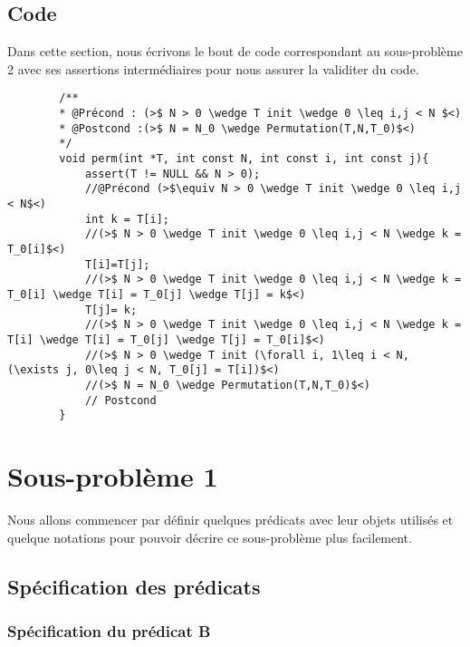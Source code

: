 \documentclass[a4paper, 11pt, oneside]{article}
\begin{document}
    \subsection{Code}
        Dans cette section, nous écrivons le bout de code correspondant au sous-problème 2 avec ses assertions
        intermédiaires pour nous assurer la validiter du code.
        \begin{lstlisting}
        /**
        * @Précond : (>$ N > 0 \wedge T init \wedge 0 \leq i,j < N $<)
        * @Postcond :(>$ N = N_0 \wedge Permutation(T,N,T_0)$<)
        */
        void perm(int *T, int const N, int const i, int const j){
            assert(T != NULL && N > 0);
            //@Précond (>$\equiv N > 0 \wedge T init \wedge 0 \leq i,j < N$<)
            int k = T[i];
            //(>$ N > 0 \wedge T init \wedge 0 \leq i,j < N \wedge k = T_0[i]$<)
            T[i]=T[j];
            //(>$ N > 0 \wedge T init \wedge 0 \leq i,j < N \wedge k = T_0[i] \wedge T[i] = T_0[j] \wedge T[j] = k$<)
            T[j]= k;
            //(>$ N > 0 \wedge T init \wedge 0 \leq i,j < N \wedge k = T[i] \wedge T[i] = T_0[j] \wedge T[j] = T_0[i]$<)
            //(>$ N > 0 \wedge T init (\forall i, 1\leq i < N, (\exists j, 0\leq j < N, T_0[j] = T[i])$<)
            //(>$ N = N_0 \wedge Permutation(T,N,T_0)$<)
            // Postcond
        }    
        \end{lstlisting}

\section{Sous-problème 1}
    Nous allons commencer par définir quelques prédicats avec leur objets utilisés et quelque notations 
    pour pouvoir décrire ce sous-problème plus facilement.

    \subsection{Spécification des prédicats}

        \subsubsection{Spécification du prédicat B}
\end{document}
